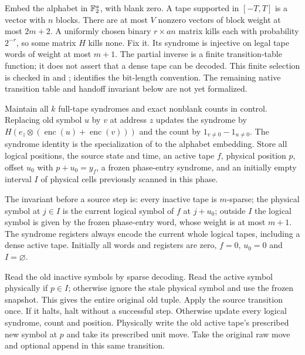 \begin{informalproof}
Embed the alphabet in $\mathbb{F}_2^a$, with blank zero. A tape supported in
$[-T,T]$ is a vector with $n$ blocks. There are at most $V$ nonzero vectors of block
weight at most $2m+2$. A uniformly chosen binary $r\times an$ matrix kills
each with probability $2^{-r}$, so some matrix $H$ kills none. Fix it.
Its syndrome is injective on legal tape words of weight at most $m+1$.
The partial inverse is a finite transition-table function; it does not
assert that a dense tape can be decoded. This finite selection is checked in
 and ;
 identifies the bit-length convention.
The remaining native transition table and handoff invariant below are not
yet formalized.

Maintain all $k$ full-tape syndromes and exact nonblank counts in control.
Replacing old symbol $u$ by $v$ at address $z$ updates the syndrome by
$H(e_z\otimes(\operatorname{enc}(u)+\operatorname{enc}(v)))$ and the count
by $1_{v\ne0}-1_{u\ne0}$. The syndrome identity is the specialization of
 to the alphabet embedding.
Store all logical positions, the source state and
time, an active tape $f$, physical position $p$, offset $u_0$ with
$p+u_0=y_f$, a frozen phase-entry syndrome, and an initially empty interval
$I$ of physical cells previously scanned in this phase.

The invariant before a source step is: every inactive tape is $m$-sparse;
the physical symbol at $j\in I$ is the current logical symbol of $f$ at
$j+u_0$; outside $I$ the logical symbol is given by the frozen phase-entry
word, whose weight is at most $m+1$. The syndrome registers always encode
the current whole logical tapes, including a dense active tape. Initially
all words and registers are zero, $f=0$, $u_0=0$ and $I=\varnothing$.

Read the old inactive symbols by sparse decoding. Read the active symbol
physically if $p\in I$; otherwise ignore the stale physical symbol and use
the frozen snapshot. This gives the entire original old tuple. Apply the
source transition once. If it halts, halt without a successful step. Otherwise
update every logical syndrome, count and position. Physically write the old
active tape's prescribed new symbol at $p$ and take its prescribed unit move.
Take the original raw move and optional append in this same transition.


\end{informalproof}
